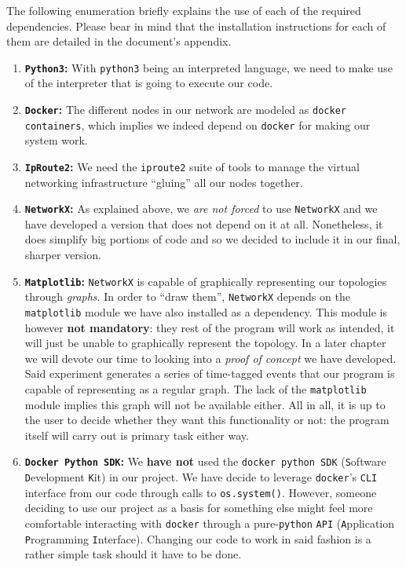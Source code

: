             The following enumeration briefly explains the use of each of the required dependencies. Please bear in mind that the installation instructions for each of them are detailed in the document's appendix.\\

            \begin{enumerate}
                \item \textbf{\texttt{Python3}:} With \texttt{python3} being an interpreted language, we need to make use of the interpreter that is going to execute our code.
                \item \textbf{\texttt{Docker}:} The different nodes in our network are modeled as \texttt{docker containers}, which implies we indeed depend on \texttt{docker} for making our system work.
                \item \textbf{\texttt{IpRoute2}:} We need the \texttt{iproute2} suite of tools to manage the virtual networking infrastructure ``gluing'' all our nodes together.
                \item \textbf{\texttt{NetworkX}:} As explained above, we \textit{are not forced} to use \texttt{NetworkX} and we have developed a version that does not depend on it at all. Nonetheless, it does simplify big portions of code and so we decided to include it in our final, sharper version.
                \item \textbf{\texttt{Matplotlib}:} \texttt{NetworkX} is capable of graphically representing our topologies through \textit{graphs}. In order to ``draw them'', \texttt{NetworkX} depends on the \texttt{matplotlib} module we have also installed as a dependency. This module is however \textbf{not mandatory}: they rest of the program will work as intended, it will just be unable to graphically represent the topology. In a later chapter we will devote our time to looking into a \textit{proof of concept} we have developed. Said experiment generates a series of time-tagged events that our program is capable of representing as a regular graph. The lack of the \texttt{matplotlib} module implies this graph will not be available either. All in all, it is up to the user to decide whether they want this functionality or not: the program itself will carry out is primary task either way.
                \item \textbf{\texttt{Docker Python SDK}:} We \textbf{have not} used the \texttt{docker python SDK} (\texttt{S}oftware \texttt{D}evelopment \texttt{K}it) in our project. We have decide to leverage \texttt{docker}'s \texttt{CLI} interface from our code through calls to \texttt{os.system()}. However, someone deciding to use our project as a basis for something else might feel more comfortable interacting with \texttt{docker} through a pure-\texttt{python} \texttt{API} (\texttt{A}pplication \texttt{P}rogramming \texttt{I}nterface). Changing our code to work in said fashion is a rather simple task should it have to be done.
            \end{enumerate}

